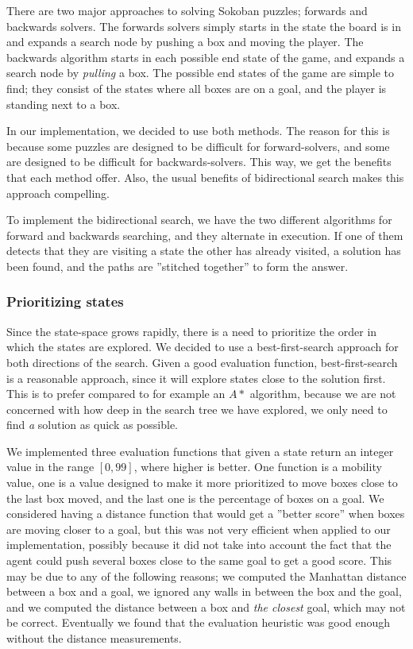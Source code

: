 \documentclass[a4paper,11pt]{article}
\begin{document}
There are two major approaches to solving Sokoban puzzles; forwards and backwards solvers.
The forwards solvers simply starts in the state the board is in and expands a search node
by pushing a box and moving the player.
The backwards algorithm starts in each possible end state of the game,
and expands a search node by \emph{pulling} a box.
The possible end states of the game are simple to find;
they consist of the states where all boxes are on a goal, and the player
is standing next to a box.

In our implementation, we decided to use both methods.
The reason for this is because some puzzles are designed to be difficult
for forward-solvers, and some are designed to be difficult for backwards-solvers.
This way, we get the benefits that each method offer.
Also, the usual benefits of bidirectional search makes this approach compelling.

To implement the bidirectional search, we have the two different algorithms
for forward and backwards searching, and they alternate in execution.
If one of them detects that they are visiting a state the other has already visited,
a solution has been found, and the paths are ''stitched together'' to form the answer.

\subsubsection{Prioritizing states}
\label{sec:prio}

Since the state-space grows rapidly, there is a need to
prioritize the order in which the states are explored.
We decided to use a best-first-search approach for both directions of the search.
Given a good evaluation function, best-first-search is a reasonable
approach, since it will explore states close to the solution first.
This is to prefer compared to for example an $A*$ algorithm,
because we are not concerned with how deep in the
search tree we have explored, we only need to find 
\emph{a} solution as quick as possible.

We implemented three evaluation functions that given a state return an integer value in the range
$[0, 99]$, where higher is better.
One function is a mobility value, one is a value designed to make
it more prioritized to move boxes close to the last box moved,
and the last one is the percentage of boxes on a goal.
We considered having a distance function that would get a ''better score''
when boxes are moving closer to a goal, but this was not very efficient
when applied to our implementation,
possibly because it did not take into account the fact that the agent could push several boxes
close to the same goal to get a good score.
This may be due to any of the following reasons;
	we computed the Manhattan distance between a box and a goal,
	we ignored any walls in between the box and the goal,
	and we computed the distance between a box and \emph{the closest} goal, which may not be correct.
Eventually we found that the evaluation heuristic was good enough without the distance measurements.
\end{document}
